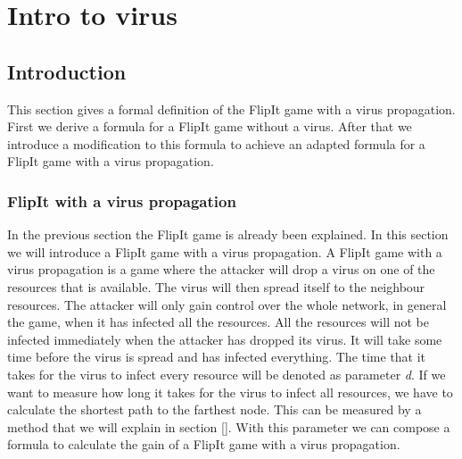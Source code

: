 \chapter{Intro to virus}
\label{cha:6}



\section{Introduction}
This section gives a formal definition of the FlipIt game with a virus propagation. First we derive a formula for a FlipIt game without a virus. After that we introduce a modification to this formula to achieve an adapted formula for a FlipIt game with a virus propagation. 

\subsection{FlipIt with a virus propagation}
In the previous section the FlipIt game is already been explained. In this section we will introduce a FlipIt game with a virus propagation. A FlipIt game with a virus propagation is a game where the attacker will drop a virus on one of the resources that is available. The virus will then spread itself to the neighbour resources. The attacker will only gain control over the whole network, in general the game, when it has infected all the resources. All the resources will not be infected immediately when the attacker has dropped its virus. It will take some time before the virus is spread and has infected everything. The time that it takes for the virus to infect every resource will be denoted as parameter \textit{d}. If we want to measure how long it takes for the virus to infect all resources, we have to calculate the shortest path to the farthest node. This can be measured by a method that we will explain in section []. With this parameter we can compose a formula to calculate the gain of a FlipIt game with a virus propagation.  \\ 

